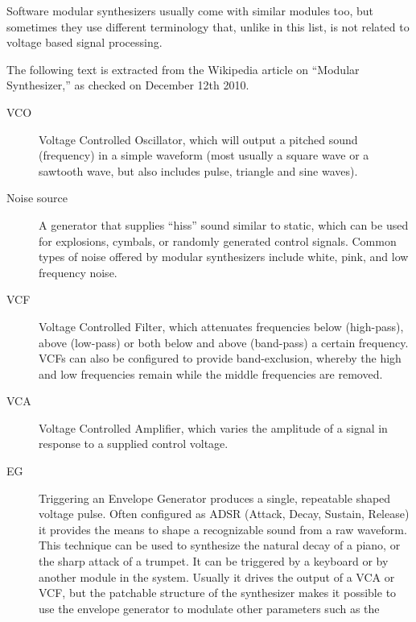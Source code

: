 \begin{mynote}
  \label{note:modsynth} Software modular synthesizers usually come
  with similar modules too, but sometimes they use different
  terminology that, unlike in this list, is not related to voltage
  based signal processing.
  
  The following text is extracted from the Wikipedia
  article on ``Modular Synthesizer,'' as checked on December 12th
  2010.
 
  \begin{description}
  \item[VCO]  Voltage
    Controlled Oscillator, which will output a pitched sound
    (frequency) in a simple waveform (most usually a square wave or a
    sawtooth wave, but also includes pulse, triangle and sine waves).
  \item[Noise source]  A generator that supplies
    ``hiss'' sound similar to static, which can be used for
    explosions, cymbals, or randomly generated control signals. Common
    types of noise offered by modular synthesizers include white,
    pink, and low frequency noise.
  \item[VCF]  Voltage Controlled
    Filter, which attenuates frequencies below (high-pass), above
    (low-pass) or both below and above (band-pass) a certain
    frequency. VCFs can also be configured to provide band-exclusion,
    whereby the high and low frequencies remain while the middle
    frequencies are removed.
  \item[VCA]  Voltage
    Controlled Amplifier, which varies the amplitude of a signal in
    response to a supplied control voltage.
  \item[EG]  Triggering an Envelope
    Generator produces a single, repeatable shaped voltage
    pulse. Often configured as ADSR (Attack, Decay, Sustain, Release)
    it provides the means to shape a recognizable sound from a raw
    waveform. This technique can be used to synthesize the natural
    decay of a piano, or the sharp attack of a trumpet. It can be
    triggered by a keyboard or by another module in the
    system. Usually it drives the output of a VCA or VCF, but the
    patchable structure of the synthesizer makes it possible to use
    the envelope generator to modulate other parameters such as the

\end{description}
\end{mynote}
